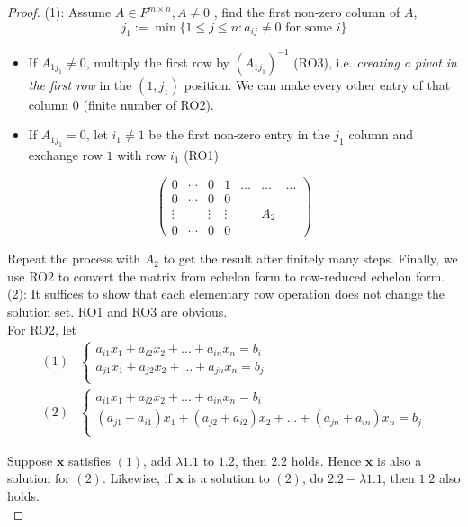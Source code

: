 \begin{proof}

(1): Assume $A \in F^{m \times n}, A \neq 0$ , find the first non-zero column of $A$, 
\[
    j_1 := \min \{ 1 \leq j \leq n: a_{ij } \neq 0 \text{ for some } i\}
\]

\begin{itemize}
    \item If $A_{1 j_1} \neq 0$, multiply the first row by $(A_{1 j_1})^{-1}$ (RO3), i.e. \textit{creating a pivot in the first row} in the $(1, j_1)$ position. We can make every other entry of that column 0 (finite number of RO2).
    \item If $A_{1 j_1} = 0$, let $i_1 \neq 1$ be the first non-zero entry in the $j_1$ column and exchange row $1$ with row $i_1$ (RO1)
\end{itemize} 

\[
\begin{pmatrix}
0 & \cdots & 0 & 1 & \hdots & \hdots & \hdots \\
0 & \cdots & 0 & 0 &   &   &   \\
\vdots &   & \vdots & \vdots & & A_2 & \\
0 & \cdots & 0 & 0 &   &   &  
\end{pmatrix}
\]


Repeat the process with $A_2$ to get the result after finitely many steps. Finally, we use RO2 to convert the matrix from echelon form to row-reduced echelon form.  \\

(2): It suffices to show that each elementary row operation does not change the solution set. RO1 and RO3 are obvious. \\


For RO2, let
\begin{align*}
    (1) & \begin{cases}
        a_{i1} x_1 + a_{i2} x_2 + \hdots + a_{in} x_n = b_i \\
        a_{j1} x_1 + a_{j2} x_2 + \hdots + a_{jn} x_n = b_j \\
    \end{cases} \\
    (2) & \begin{cases}
        a_{i1} x_1 + a_{i2} x_2 + \hdots + a_{in} x_n = b_i \\
        (a_{j1} + a_{i1}) x_1 + (a_{j2} + a_{i2}) x_2 + \hdots + (a_{jn} + a_{in})x_n = b_j \\
    \end{cases}
\end{align*}

Suppose $\bm{x}$ satisfies $(1)$, add $\lambda 1.1$ to $1.2$, then $2.2$ holds. Hence $ \bm{x}$ is also a solution for $(2)$. Likewise, if $\bm{x}$ is a solution to $(2)$, do $2.2 - \lambda 1.1$, then $1.2$ also holds. \\
\end{proof}

